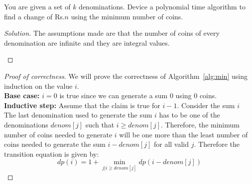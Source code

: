 \begin{solution}{4.2}
    \begin{question}
        You are given a set of $k$ denominations. Device a polynomial time algorithm to find a change of Rs.$n$ using the minimum number of
coins.    
    \end{question}
    \tcblower{}
    \begin{proof}[Solution]
        The assumptions made are that the number of coins of every denomination are infinite and they are integral values.
        \begin{algorithm}[H]
            \caption{Find minimum number of denominations to achieve value of $n$}\label{alg:min}
            \begin{algorithmic}
                   
                 
                        \EndIf{}
                    \EndFor{}
                \EndFor{}
            \EndProcedure{}
            \end{algorithmic}
        \end{algorithm}
    \end{proof}
    \begin{proof}[Proof of correctness]
        We will prove the correctness of Algorithm~\ref{alg:min} using induction on the value $i$.\\
        \textbf{Base case:} $i=0$ is true since we can generate a sum $0$ using $0$ coins.\\
        \textbf{Inductive step:} Assume that the claim is true for $i-1$. Consider the sum $i$\\
        The last denomination used to generate the sum $i$ has to be one of the denominations $denom[j]$ such that $i\geq denom[j]$. Therefore, the minimum number of coins needed to generate $i$ will be one more than the least number of coins needed to generate the sum $i-denom[j]$ for all valid $j$. Therefore the transition equation is given by:
        \begin{equation}
            dp(i) = 1 + \underset{j|i\geq denom[j]}\min dp(i-denom[j])

\end{equation}
\end{proof}
\end{solution}
